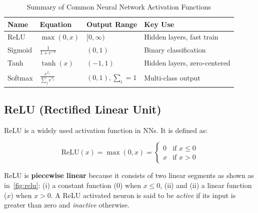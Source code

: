 \documentclass[oneside,11pt,dvipsnames]{book}
\numberwithin{equation}{section}
\theoremstyle{definition}
\theoremstyle{remark}
\newcommand{\relu}[1]{\mathrm{ReLU}\left(#1\right)}
\newcommand{\sigmoid}[1]{\mathrm{sigmoid}\left(#1\right)}
\begin{document}
\begin{table}
  \centering
  \caption{Summary of Common Neural Network Activation Functions}\label{tab:activation}
  \small
  \begin{tabular}{llll}
    \toprule
    \textbf{Name} & \textbf{Equation} & \textbf{Output Range} & \textbf{Key Use} \\
    \midrule
    ReLU      & $ \max(0, x) $                   & $[0, \infty)$   & Hidden layers, fast train \\    
    Sigmoid   & $ \frac{1}{1 + e^{-x}} $         & $(0, 1)$        & Binary classification \\
    Tanh      & $ \tanh(x) $                     & $(-1, 1)$       & Hidden layers, zero-centered \\
    Softmax   & $ \frac{e^{x_i}}{\sum_j e^{x_j}} $& $(0, 1), \sum_i=1 $ & Multi-class output \\    
    \bottomrule
  \end{tabular}
\end{table}


\subsection{ReLU (Rectified Linear Unit)}\label{sec:relu}

ReLU is a widely used activation function in NNs. It is defined as:

\[
\relu{x} = \max(0, x) = 
\begin{cases}
0 & \text{if } x \leq 0 \\
x & \text{if } x > 0
\end{cases}
\]

ReLU is \textbf{piecewise linear} because it consists of two linear segments as shown as in~\autoref{fig:relu}: (i) a constant function ($0$) when $x \leq 0$, (ii) and (ii) a linear function ($x$) when $x > 0$.
A ReLU activated neuron is said to be \emph{active} if its input is greater than zero and \emph{inactive} otherwise.
\end{document}
